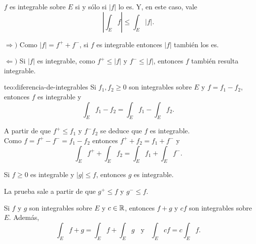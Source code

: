                     \begin{teorema}{}
                    $f$ es integrable sobre $E$ si y s\'olo si $|f|$ lo es.  Y, en este caso, vale
                    \[
                    \left|\int_E f\right|\leq \int_E |f|.
                    \]
                    \end{teorema}
                    
                    \begin{demo}
                    $\Rightarrow)$
                    Como $|f|=f^++f^-$, si $f$ es integrable entonces $|f|$ tambi\'en los es. 
                    
                    $\Leftarrow)$
                    Si $|f|$ es integrable, como $f^+\leq |f|$ y $f^-\leq |f|$, entonces $f$ tambi\'en resulta integrable.
                    \end{demo}
                    
                    \begin{teorema}{teo:diferencia-de-integrables}
                    Si $f_1,f_2\geq 0$ son integrables sobre $E$ y $f=f_1-f_2$, entonces $f$ es integrable y 
                    \[\int_E f_1-f_2 = \int_E f_1 - \int_E f_2.\]
                    \end{teorema}
                    
                    \begin{demo}
                    A partir de  que $f^+\leq f_1$ y $f^-f_2$ se deduce que $f$ es integrable.  
                    \\
                    Como $f=f^+-f^-=f_1-f_2$ entonces 
                    $f^+ + f_2=f_1 + f^-$ y 
                    \[
                    \int_E f^+ + \int_E f_2=
                    \int_E f_1 + \int_E f^-.
                    \]
                    \end{demo}
                    
                    \begin{teorema}{}
                    Si $f\geq 0$ es integrable y $|g|\leq f$, entonces $g$ es integrable. 
                    \end{teorema}
                    
                    \begin{demo}
                     La prueba sale a partir de que 
                    $g^+\leq f$ y $g^- \leq f$.
                    \end{demo}
                   
                   \begin{teorema}{}
                   Si $f$ y $g$ son integrables sobre $E$ y $c\in \mathbb{R}$, entonces $f+g$ y $cf$ son integrables sobre $E$. Adem\'as, 
                   \[
                   \int_E f+g =\int_E f +\int_E g
                   \;\;\mbox{ y }\;\;
                   \int_E cf =c\int_E f.
                   \]
                 \end{teorema}
                    
